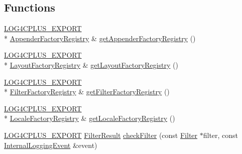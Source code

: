 \subsection*{Functions}
\begin{DoxyCompactItemize}
\item 
\hyperlink{config_8hxx_ab13cb1a5317c245ee2ef4f2bfe0cfb2d}{L\-O\-G4\-C\-P\-L\-U\-S\-\_\-\-E\-X\-P\-O\-R\-T} \\*
\hyperlink{namespacelog4cplus_1_1spi_aaec7122d9afe7d4e06cd100cc62418f7}{Appender\-Factory\-Registry} \& \hyperlink{namespacelog4cplus_1_1spi_a18f7335ecb395ad440394f5577cd80f9}{get\-Appender\-Factory\-Registry} ()
\item 
\hyperlink{config_8hxx_ab13cb1a5317c245ee2ef4f2bfe0cfb2d}{L\-O\-G4\-C\-P\-L\-U\-S\-\_\-\-E\-X\-P\-O\-R\-T} \\*
\hyperlink{namespacelog4cplus_1_1spi_afcec0afcb2d25a187db1e85feb2d0796}{Layout\-Factory\-Registry} \& \hyperlink{namespacelog4cplus_1_1spi_aa057ffc0b98a3e7731117cdcffbcacde}{get\-Layout\-Factory\-Registry} ()
\item 
\hyperlink{config_8hxx_ab13cb1a5317c245ee2ef4f2bfe0cfb2d}{L\-O\-G4\-C\-P\-L\-U\-S\-\_\-\-E\-X\-P\-O\-R\-T} \\*
\hyperlink{namespacelog4cplus_1_1spi_a201100cf253db6d2160f88b20bbf7d9d}{Filter\-Factory\-Registry} \& \hyperlink{namespacelog4cplus_1_1spi_a8699558c73ecfe0263f93960d5c1d302}{get\-Filter\-Factory\-Registry} ()
\item 
\hyperlink{config_8hxx_ab13cb1a5317c245ee2ef4f2bfe0cfb2d}{L\-O\-G4\-C\-P\-L\-U\-S\-\_\-\-E\-X\-P\-O\-R\-T} \\*
\hyperlink{namespacelog4cplus_1_1spi_ae93cf5d075d4355919917879db043004}{Locale\-Factory\-Registry} \& \hyperlink{namespacelog4cplus_1_1spi_a1204090fdb7f5da78c94348e13f8c3e1}{get\-Locale\-Factory\-Registry} ()
\item 
\hyperlink{config_8hxx_ab13cb1a5317c245ee2ef4f2bfe0cfb2d}{L\-O\-G4\-C\-P\-L\-U\-S\-\_\-\-E\-X\-P\-O\-R\-T} \hyperlink{namespacelog4cplus_1_1spi_aa910f475d36c00f943ef78e37d11e3f6}{Filter\-Result} \hyperlink{namespacelog4cplus_1_1spi_abe742791c313b1e8e6b7325584a98f6a}{check\-Filter} (const \hyperlink{classlog4cplus_1_1spi_1_1Filter}{Filter} $\ast$filter, const \hyperlink{classlog4cplus_1_1spi_1_1InternalLoggingEvent}{Internal\-Logging\-Event} \&event)
\end{DoxyCompactItemize}


